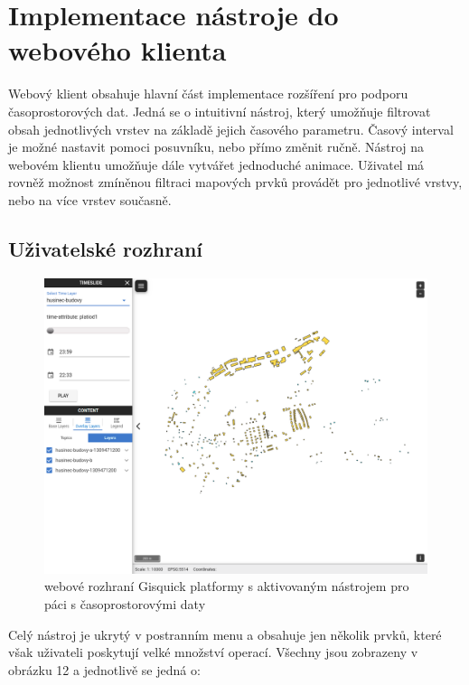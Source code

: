 \newpage
\section{Implementace nástroje do webového klienta}
Webový klient obsahuje hlavní část implementace rozšíření pro podporu časoprostorových dat. Jedná se o intuitivní nástroj, který umožňuje filtrovat obsah jednotlivých vrstev na základě jejich časového parametru. Časový interval je možné nastavit pomoci posuvníku, nebo přímo změnit ručně. Nástroj na webovém klientu umožňuje dále vytvářet jednoduché animace. Uživatel má rovněž možnost zmíněnou filtraci mapových prvků provádět pro jednotlivé vrstvy, nebo na více vrstev současně. 

\subsection{Uživatelské rozhraní}

\begin{figure}[h!]
	\centering
	\includegraphics[width=1\textwidth]{../img/gisquick-time-tool.png}
	\caption{webové rozhraní Gisquick platformy s aktivovaným nástrojem pro páci s časoprostorovými daty}
	\label{fig:arcgis-time-settings}
\end{figure}

Celý nástroj je ukrytý v postranním menu a obsahuje jen několik prvků, které však uživateli poskytují velké množství operací. Všechny jsou zobrazeny v obrázku 12 a jednotlivě se jedná o:

